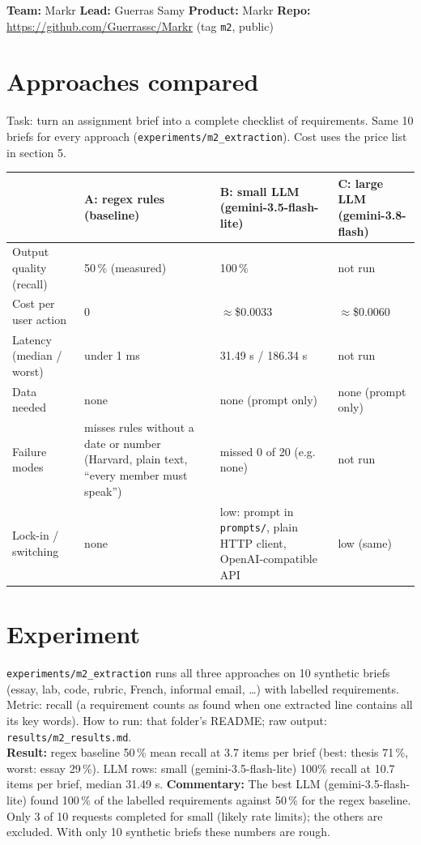 \documentclass[10pt]{article}
\begin{document}
\small\sloppy
\textbf{Team:} Markr \quad \textbf{Lead:} Guerras Samy \quad \textbf{Product:} Markr \quad \textbf{Repo:} \url{https://github.com/Guerrassc/Markr} (tag \texttt{m2}, public)

\section{Approaches compared}
Task: turn an assignment brief into a complete checklist of requirements. Same 10 briefs for every approach (\texttt{experiments/m2\_extraction}). Cost uses the price list in section 5.
\footnotesize
\begin{tabular}{@{}p{2.9cm}p{3.9cm}p{4.5cm}p{4.5cm}@{}}
\toprule
 & \textbf{A: regex rules (baseline)} & \textbf{B: small LLM} (gemini-3.5-flash-lite) & \textbf{C: large LLM} (gemini-3.8-flash) \\
\midrule
Output quality (recall) & 50\,\% (measured) & 100\,\% & not run \\
Cost per user action & \texttt{\texteuro{}}0 & $\approx$\$0.0033 & $\approx$\$0.0060 \\
Latency (median / worst) & under 1 ms & 31.49 s / 186.34 s & not run \\
Data needed & none & none (prompt only) & none (prompt only) \\
Failure modes & misses rules without a date or number (Harvard, plain text, ``every member must speak'') & missed 0 of 20 (e.g. none) & not run \\
Lock-in / switching & none & low: prompt in \texttt{prompts/}, plain HTTP client, OpenAI-compatible API & low (same) \\
\bottomrule
\end{tabular}
\small

\section{Experiment}
\texttt{experiments/m2\_extraction} runs all three approaches on 10 synthetic briefs (essay, lab, code, rubric, French, informal email, \dots) with labelled requirements. Metric: recall (a requirement counts as found when one extracted line contains all its key words). How to run: that folder's README; raw output: \texttt{results/m2\_results.md}.\\
\textbf{Result:} regex baseline 50\,\% mean recall at 3.7 items per brief (best: thesis 71\,\%, worst: essay 29\,\%). LLM rows: small (gemini-3.5-flash-lite) 100\% recall at 10.7 items per brief, median 31.49 s. \textbf{Commentary:} The best LLM (gemini-3.5-flash-lite) found 100\,\% of the labelled requirements against 50\,\% for the regex baseline. Only 3 of 10 requests completed for small (likely rate limits); the others are excluded. With only 10 synthetic briefs these numbers are rough.
\end{document}
